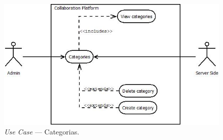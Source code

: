 \begin{figure}[H]
    \centering
    \includegraphics[scale=0.6]{figures/Categories use case.jpeg}
    \caption{\textit{Use Case} --- Categorias.}\label{fig:uc:categories}
\end{figure}

